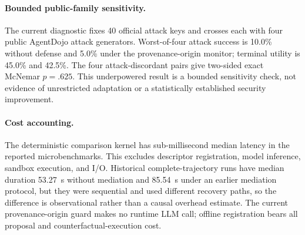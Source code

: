 \paragraph{Bounded public-family sensitivity.}
The current diagnostic fixes 40 official attack keys and crosses each with
four public AgentDojo attack generators.  Worst-of-four attack success is
10.0\% without defense and 5.0\% under the provenance-origin monitor; terminal
utility is 45.0\% and 42.5\%.  The four attack-discordant pairs give two-sided
exact McNemar $p=.625$.  This underpowered result is a bounded sensitivity
check, not evidence of unrestricted adaptation or a statistically established
security improvement.

\paragraph{Cost accounting.}
The deterministic comparison kernel has sub-millisecond median latency in the
reported microbenchmarks.  This excludes descriptor registration, model
inference, sandbox execution, and I/O.  Historical complete-trajectory runs
have median duration 53.27~s without mediation and 85.54~s under an earlier
mediation protocol, but they were sequential and used different recovery paths,
so the difference is observational rather than a causal overhead estimate.  The
current provenance-origin guard makes no runtime LLM call; offline registration
bears all proposal and counterfactual-execution cost.
